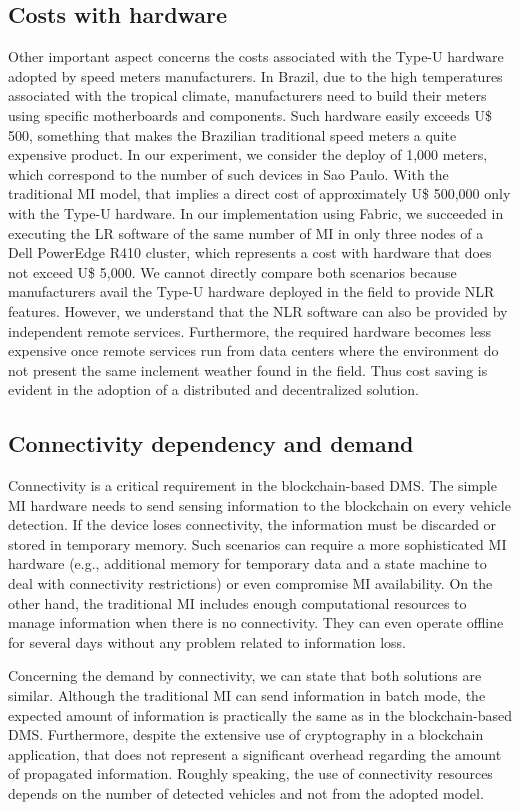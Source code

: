 \documentclass[journal]{IEEEtran}
\begin{document}
\subsection{Costs with hardware}
Other important aspect concerns the costs associated with the Type-U hardware adopted by speed meters manufacturers.
In Brazil, due to the high temperatures associated with the tropical climate, manufacturers need to build their meters using specific motherboards and components.
Such hardware easily exceeds U\$ 500, something that makes the Brazilian traditional speed meters a quite expensive product.
In our experiment, we consider the deploy of 1,000 meters, which correspond to the number of such devices in Sao Paulo.
With the traditional MI model, that implies a direct cost of approximately U\$ 500,000 only with the Type-U hardware.
In our implementation using Fabric, we succeeded in executing the LR software of the same number of MI in only three nodes of a Dell PowerEdge R410 cluster, which represents a cost with hardware that does not exceed U\$ 5,000.
We cannot directly compare both scenarios because manufacturers avail the Type-U hardware deployed in the field to provide NLR features.
However, we understand that the NLR software can also be provided by independent remote services.
Furthermore, the required hardware becomes less expensive once remote services run from data centers where the environment do not present the same inclement weather found in the field.
Thus cost saving is evident in the adoption of a distributed and decentralized solution.

\subsection{Connectivity dependency and demand}
Connectivity is a critical requirement in the blockchain-based DMS.
The simple MI hardware needs to send sensing information to the blockchain on every vehicle detection.
If the device loses connectivity, the information must be discarded or stored in temporary memory.
Such scenarios can require a more sophisticated MI hardware (e.g., additional memory for temporary data and a state machine to deal with connectivity restrictions) or even compromise MI availability.
On the other hand, the traditional MI includes enough computational resources to manage information when there is no connectivity.
They can even operate offline for several days without any problem related to information loss.

Concerning the demand by connectivity, we can state that both solutions are similar.
Although the traditional MI can send information in batch mode, the expected amount of information is practically the same as in the blockchain-based DMS.
Furthermore, despite the extensive use of cryptography in a blockchain application, that does not represent a significant overhead regarding the amount of propagated information.
Roughly speaking, the use of connectivity resources depends on the number of detected vehicles and not from the adopted model.
\end{document}
